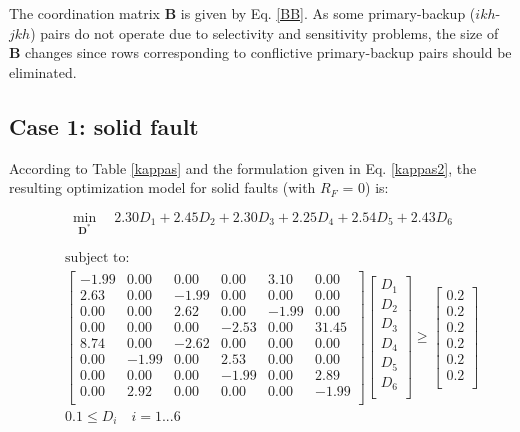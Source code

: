 \documentclass[letterpaper, 10 pt, conference]{IEEEtran}
\begin{document}
The coordination matrix $\mathbf{B}$ is given by Eq. \ref{BB}. As some primary-backup ($ikh$-$jkh$) pairs
 do not operate due to
selectivity and sensitivity problems, the size of $\mathbf{B}$ changes since  rows corresponding to conflictive
primary-backup pairs should be eliminated. 


\subsection{Case 1: solid fault}\label{1}

 According to Table \ref{kappas} and the formulation given in Eq. \ref{kappas2}, the resulting optimization model for solid faults (with $R_F$ = 0) is:

\scriptsize
\begin{equation}\nonumber
   \min_{\mathbf{D^*}}\quad 2.30 D_1+2.45  D_2+2.30  D_3+2.25  D_4+ 2.54  D_5+2.43 D_6
\end{equation}

\begin{eqnarray}\nonumber
&&\mbox{subject to}:\\\nonumber
&&  \begin{bmatrix}
-1.99	&	0.00	&	0.00	&	0.00	&	3.10	&	0.00	\\
2.63	&	0.00	&	-1.99	&	0.00	&	0.00	&	0.00	\\
0.00	&	0.00	&	2.62	&	0.00	&	-1.99	&	0.00	\\
0.00	&	0.00	&	0.00	&	-2.53	&	0.00	&	31.45	\\
8.74	&	0.00	&	-2.62	&	0.00	&	0.00	&	0.00	\\
0.00	&	-1.99	&	0.00	&	2.53	&	0.00	&	0.00	\\
0.00	&	0.00	&	0.00	&	-1.99	&	0.00	&	2.89	\\
0.00	&	2.92	&	0.00	&	0.00	&	0.00	&	-1.99	\\
  \end{bmatrix}
  \begin{bmatrix} \nonumber
  D_1\\D_2\\D_3\\D_4\\D_5\\D_6\\
  \end{bmatrix}
\ge  \begin{bmatrix} \nonumber
  0.2\\0.2\\0.2\\0.2\\0.2\\0.2\\
  \end{bmatrix}\\\nonumber
& & 0.1\le{D_i}\quad i=1...6\\\nonumber
 \end{eqnarray}
\normalsize
\end{document}
